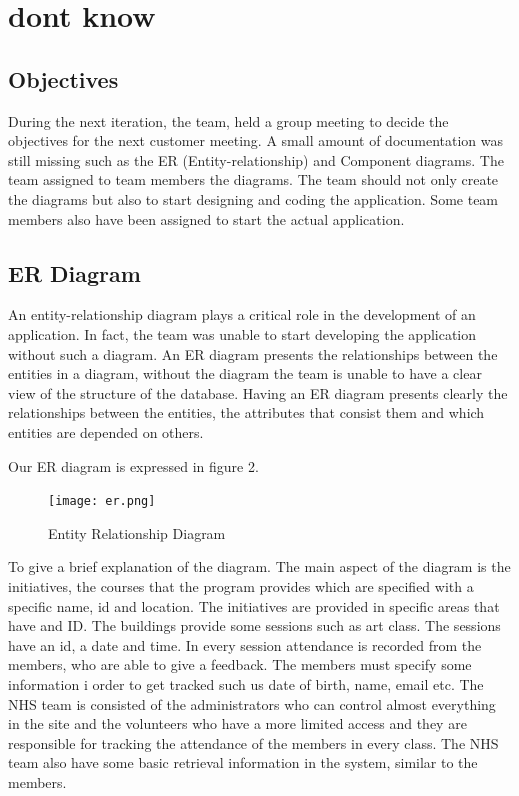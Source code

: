\documentclass{l3proj}
\begin{document}
\section{dont know}
\label{sec:dont know}

\subsection{Objectives}
\label{sec:objectives}

During the next iteration, the team, held a group meeting to decide the objectives for the next customer meeting. A small amount of documentation was still missing such as the ER (Entity-relationship) and Component diagrams. The team assigned to team members the diagrams. The team should not only create the diagrams but also to start designing and coding the application. Some team members also have been assigned to start the actual application.

\subsection{ER Diagram}
\label{sec:er}

An entity-relationship diagram plays a critical role in the development of an application. In fact, the team was unable to start developing the application without such a diagram. An ER diagram presents the relationships between the entities in a diagram, without the diagram the team is unable to have a clear view of the structure of the database. Having an ER diagram presents clearly the relationships between the entities, the attributes that consist them and which entities are depended on others.

Our ER diagram is expressed in figure 2.

\begin{figure}
  \centerline{\texttt{[image: er.png]}}
  \caption{Entity Relationship Diagram}
  \label{fig:er}
\end{figure}

To give a brief explanation of the diagram. The main aspect of the diagram is the initiatives, the courses that the program provides which are specified with a specific name, id and location. The initiatives are provided in specific areas that have and ID. The buildings provide some sessions such as art class. The sessions have an id, a date and time. In every session attendance is recorded from the members, who are able to give a feedback. The members must specify some information i order to get tracked such us date of birth, name, email etc. The NHS team is consisted of the administrators who can control almost everything in the site and the volunteers who have a more limited access and they are responsible for tracking the attendance of the members in every class. The NHS team also have some basic retrieval information in the system, similar to the members.
\end{document}
